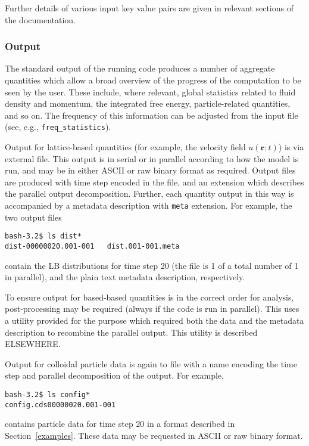 Further details of various input key value pairs are given in
relevant sections of the documentation.

\subsubsection{Output}

The standard output of the running code produces a number of
aggregate quantities which allow a broad overview of the progress
of the computation to be seen by the user. These include, where
relevant, global statistics related to fluid density and momentum,
the integrated free energy, particle-related quantities, and so on.
The frequency of this information can be adjusted from the input
file (see, e.g., \texttt{freq\_statistics}).

Output for lattice-based quantities (for example, the velocity field
$u(\mathbf{r}; t)$) is via external file. This output is in serial
or in parallel according to how the model is run, and may be in
either ASCII or raw binary format as required. Output files are produced
with time step encoded in the file, and an extension which describes the
parallel output decomposition. Further, each quantity output in this way
is accompanied by a metadata description with \texttt{meta} extension.
For example, the two output files
\begin{lstlisting}
bash-3.2$ ls dist*
dist-00000020.001-001   dist.001-001.meta
\end{lstlisting}
contain the LB distributions for time step 20 (the file is 1 of a total
number of 1 in parallel), and the plain text metadata description,
respectively.

To ensure output for based-based quantities is in the correct order for
analysis, post-processing
may be required (always if the code is run in parallel). This uses a utility
provided for the purpose which required both the data and the metadata
description to recombine the parallel output. This utility is described
ELSEWHERE.

Output for colloidal particle data is again to file with a name encoding
the time step and parallel decomposition of the output. For example,
\begin{lstlisting}
bash-3.2$ ls config*
config.cds00000020.001-001
\end{lstlisting}
contains particle data for time step 20 in a format described in
Section~\ref{examples}.
These data may be requested in ASCII or raw binary format.


